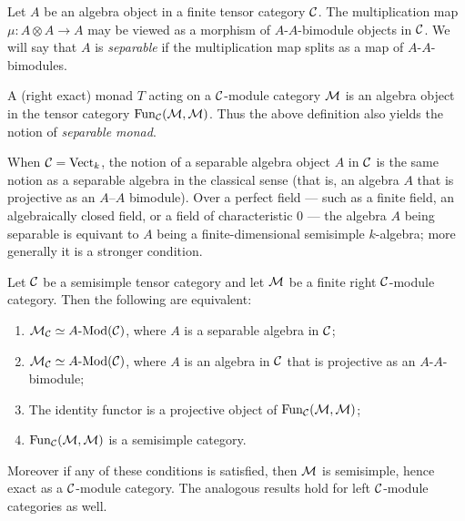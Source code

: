 \documentclass{amsart}
\begin{document}
\begin{definition}
	Let $A$ be an algebra object in a finite tensor category $\mathcal C$. The multiplication map $\mu: A \otimes A \to A$ may be viewed as a morphism of $A$-$A$-bimodule objects in $\mathcal C$. We will say that $A$ is {\em separable} if the multiplication map splits as a map of $A$-$A$-bimodules. 
\end{definition}

\begin{remark}
	A (right exact) monad $T$ acting on a $\mathcal C$-module category $\mathcal M$ is an algebra object in the tensor category $\operatorname{Fun}_\mathcal C(\mathcal M, \mathcal M)$. Thus the above definition also yields the notion of {\em separable monad}. 
\end{remark}

\begin{remark}
	When $\mathcal C = \mathrm{Vect}_k$, the notion of a separable algebra object $A$ in $\mathcal C$ is the same notion as a separable algebra in the classical sense (that is, an algebra $A$ that is projective as an $A$--$A$ bimodule). Over a perfect field --- such as a finite field, an algebraically closed field, or a field of characteristic $0$ --- the algebra $A$ being separable is equivant to $A$ being a finite-dimensional semisimple $k$-algebra; more generally it is a stronger condition. 
\end{remark}

\begin{theorem} \label{thm:SepModCats}
	Let $\mathcal C$ be a  semisimple tensor category and let $\mathcal M$ be a finite right $\mathcal C$-module category. Then the following are equivalent:
	\begin{enumerate}
		\item $\cM_\cC \simeq \Mod{A}{}(\cC)$, where $A$ is a separable algebra in $\mathcal C$;
		\item $\cM_\cC \simeq \Mod{A}{}(\cC)$, where $A$ is an algebra in $\mathcal C$ that is projective as an $A$-$A$-bimodule;
		\item The identity functor is a projective object of $\operatorname{Fun}_\mathcal C(\mathcal M, \mathcal M)$;
		\item $\operatorname{Fun}_\mathcal C(\mathcal M, \mathcal M)$ is a semisimple category. 
	\end{enumerate}
	Moreover if any of these conditions is satisfied, then $\mathcal M$ is semisimple, hence exact as a $\mathcal C$-module category. The analogous results hold for left $\mathcal C$-module categories as well. 
\end{theorem}
\end{document}
